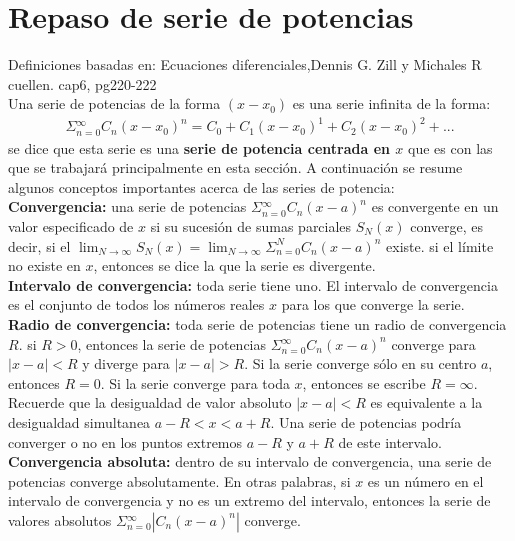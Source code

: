 \documentclass[12pt,letterpaper,oneside]{article}
\begin{document}
\section{Repaso de serie de potencias}
Definiciones basadas en: Ecuaciones diferenciales,Dennis G. Zill y Michales R cuellen. cap6, pg220-222\\
 Una serie de potencias de la forma $(x-x_0)$ es una serie infinita de la forma:\\
\begin{align*} 
\Sigma{^\infty_{n=0}}C_n (x-x_0)^n=C_0+C_1(x-x_0)^1+C_2(x-x_0)^2+...
\end{align*}
se dice que esta serie es una \textbf{serie de potencia centrada en $x$} que es con las que se trabajará principalmente en esta sección. A continuación se resume algunos conceptos importantes acerca de las series de potencia: \vspace{0.5cm}\\
\textbf{Convergencia:} una serie de potencias $\Sigma{^\infty_{n=0}}C_n(x-a)^n$ es convergente en un valor especificado de $x$ si su sucesión de sumas parciales ${S_N(x)}$ converge, es decir, si el $\displaystyle\lim_{N \to \infty} S_N(x) = \displaystyle\lim_{N \to \infty} \Sigma^N_{n=0} C_n(x-a)^n$ existe. si el límite no existe en $x$, entonces se dice la que la serie es divergente.\vspace{0.2cm}\\
 \textbf{Intervalo de convergencia:} toda serie tiene uno. El intervalo de convergencia es el conjunto de todos los números reales $x$ para los que converge la serie.\vspace{0.2cm}\\
  \textbf{Radio de convergencia:} toda serie de potencias tiene un radio de convergencia $R$. si $R>0$, entonces la serie de potencias $\Sigma{^\infty_{n=0}}C_n(x-a)^n$ converge para $|x-a|<R$ y diverge para $|x-a|>R$. Si la serie converge sólo en su centro $a$, entonces $R=0$. Si la serie converge para toda $x$, entonces se escribe $R=\infty$. Recuerde que la desigualdad de valor absoluto $|x-a|<R$ es equivalente a la desigualdad simultanea $a-R<x<a+R$. Una serie de potencias podría converger o no en los puntos extremos $a-R$ y $a+R$ de este intervalo.\vspace{0.2cm}\\ 
   \textbf{Convergencia absoluta:} dentro de su intervalo de convergencia, una serie de potencias converge absolutamente. En otras palabras, si $x$ es un número en el intervalo de convergencia y no es un extremo del intervalo, entonces la serie de valores absolutos $\Sigma{^\infty_{n=0}}|C_n(x-a)^n|$ converge.\vspace{0.2cm}\\
\end{document}
